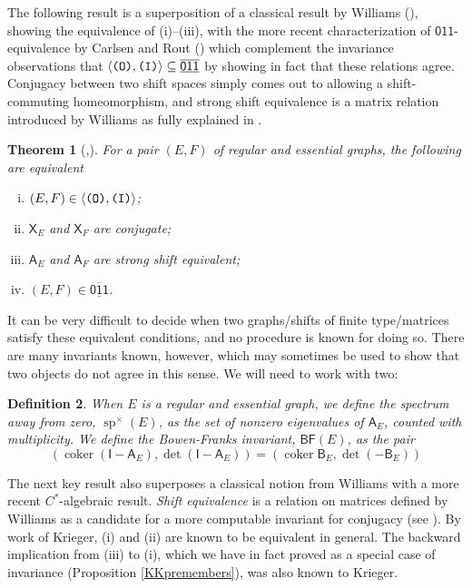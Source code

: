 \documentclass[12pt]{amsbook}%
\newcommand{\cok}{\operatorname{coker}}
\newcommand{\XX}[1]{\mathsf X_{#1}}
\newtheorem{theor}{Theorem}[section]
\theoremstyle{defin}
\newtheorem{defin}[theor]{Definition}
\theoremstyle{remark}
\numberwithin{equation}{chapter}
\numberwithin{theor}{section}
\newcommand{\spaz}{\operatorname{sp}^\times}
\newcommand{\BF}{\mathsf{BF}}
\newcommand{\Asf}{\mathsf{A}}
\newcommand{\Bsf}{\mathsf{B}}
\newcommand{\xyz}[1]{\mbox{$\mathsf{#1}$}}
\newcommand{\xyzrel}[1]{\mbox{$\overline{\underline{\mathsf{ #1}}}$}}
\newcommand{\III}{\mbox{\texttt{\textup{(I)}}}}
\newcommand{\OOO}{\mbox{\texttt{\textup{(O)}}}}
\newcommand{\idmatrix}{\mathsf{I}}
\begin{document}
 The following result is a superposition of a classical result by Williams (\cite{rfw:csft}), showing the equivalence of (i)--(iii), with the more recent characterization of \xyz{011}-equivalence by Carlsen and Rout (\cite{tmcjr:dgigc}) which complement the invariance observations that $\langle \OOO,\III\rangle\subseteq \xyzrel{011}$ by showing in fact that these relations agree. Conjugacy between two shift spaces simply comes out to allowing a shift-commuting homeomorphism, and strong shift equivalence is a matrix relation introduced by Williams as fully explained in \cite[Section 7.2]{dlbm:isdc}.
 
 \begin{theor}[\cite{rfw:csft},\cite{tmcjr:dgigc}]\label{WCR}
  For a pair $(E,F)$ of regular and essential graphs, the following are equivalent
  \begin{enumerate}[(i)]
\item $(E,F)\in\langle \OOO,\III\rangle$;  
  \item $\XX E$ and $\XX F$ are conjugate;
  \item $\mathsf{A}_E$ and $\mathsf{A}_F$ are strong shift equivalent;
  \item $(E,F)\in\xyzrel{011}$.
    \end{enumerate}
  \end{theor}
  
  
  It can be very difficult to decide when two graphs/shifts of finite type/matrices satisfy these equivalent conditions, and no procedure is known for doing so. There are many invariants known, however, which may sometimes be used to show that two objects do not agree in this sense. We will need to work with two:
  
  \begin{defin}\label{someinvs}\index{spx@$\spaz(E)$}\index{BF@$\BF(E)$}
  When $E$ is a regular and essential graph, we define the \emph{spectrum away from zero}, $\spaz(E)$, as the set of nonzero eigenvalues of ${\mathsf A}_E$, counted with multiplicity. We define the \emph{Bowen-Franks invariant}, $\BF(E)$, as the pair
 \[
 (\cok(\idmatrix-\Asf_{E}),\det(\idmatrix-\Asf_{E}))= (\cok \Bsf_{E},\det(-\Bsf_{E}))
  \]
  \end{defin}
 
  
The next key result also superposes a classical notion from Williams with a more recent $C^*$-algebraic result. \emph{Shift equivalence} is a relation on matrices defined by Williams as a candidate for a more computable invariant for conjugacy (see \cite[Definition 7.3.1]{dlbm:isdc}).  By work of Krieger, (i) and (ii) are known to be equivalent in general. The backward implication from (iii) to (i), which we have in fact proved as a special case of invariance (Proposition \ref{KKpremembers}), was also known to Krieger. 
\end{document}
